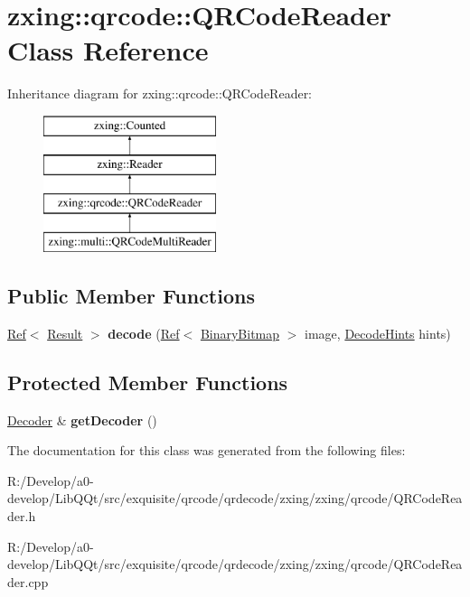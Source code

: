 \hypertarget{classzxing_1_1qrcode_1_1_q_r_code_reader}{}\section{zxing\+:\+:qrcode\+:\+:Q\+R\+Code\+Reader Class Reference}
\label{classzxing_1_1qrcode_1_1_q_r_code_reader}
Inheritance diagram for zxing\+:\+:qrcode\+:\+:Q\+R\+Code\+Reader\+:\begin{figure}[H]
\begin{center}
\leavevmode
\includegraphics[height=4.000000cm]{classzxing_1_1qrcode_1_1_q_r_code_reader}
\end{center}
\end{figure}
\subsection*{Public Member Functions}
\begin{DoxyCompactItemize}
\item 
\mbox{\label{classzxing_1_1qrcode_1_1_q_r_code_reader_aeaa671e17fab6b234f70fc654ac06f92}} 
\mbox{\hyperlink{classzxing_1_1_ref}{Ref}}$<$ \mbox{\hyperlink{classzxing_1_1_result}{Result}} $>$ {\bfseries decode} (\mbox{\hyperlink{classzxing_1_1_ref}{Ref}}$<$ \mbox{\hyperlink{classzxing_1_1_binary_bitmap}{Binary\+Bitmap}} $>$ image, \mbox{\hyperlink{classzxing_1_1_decode_hints}{Decode\+Hints}} hints)
\end{DoxyCompactItemize}
\subsection*{Protected Member Functions}
\begin{DoxyCompactItemize}
\item 
\mbox{\label{classzxing_1_1qrcode_1_1_q_r_code_reader_acb6abe4160e87f58dac9f20c0a84dca9}} 
\mbox{\hyperlink{classzxing_1_1qrcode_1_1_decoder}{Decoder}} \& {\bfseries get\+Decoder} ()
\end{DoxyCompactItemize}


The documentation for this class was generated from the following files\+:\begin{DoxyCompactItemize}
\item 
R\+:/\+Develop/a0-\/develop/\+Lib\+Q\+Qt/src/exquisite/qrcode/qrdecode/zxing/zxing/qrcode/Q\+R\+Code\+Reader.\+h\item 
R\+:/\+Develop/a0-\/develop/\+Lib\+Q\+Qt/src/exquisite/qrcode/qrdecode/zxing/zxing/qrcode/Q\+R\+Code\+Reader.\+cpp\end{DoxyCompactItemize}
